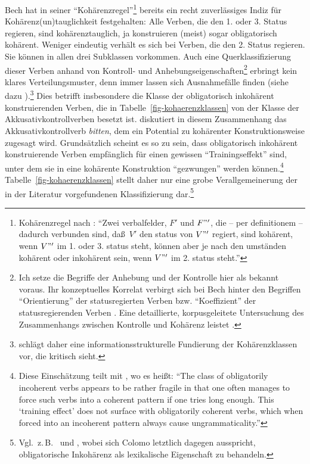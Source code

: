 Bech hat in seiner "`Kohärenzregel"'\footnote{Kohärenzregel nach \cite[\S 65]{Bech:55}: "`Zwei verbalfelder, $F'$ und $F"'$, die -- per definitionem -- dadurch verbunden sind, da\ss\ $V'$ den status von $V"'$ regiert, sind kohärent, wenn $V"'$ im 1. oder 3. status steht, können aber je nach den umständen kohärent oder inkohärent sein, wenn $V"'$ im 2. status steht."' } bereits ein recht zuverlässiges Indiz für Kohärenz\-(un)\-taug\-lich\-keit festgehalten: Alle Verben, die den 1. oder 3. Status regieren, sind kohärenztauglich, ja konstruieren (meist) sogar obligatorisch kohärent. Weniger eindeutig verhält es sich bei Verben, die den 2. Status regieren. Sie können in allen drei Subklassen vorkommen. Auch eine Querklassifizierung dieser Verben anhand von Kontroll- und Anhebungseigenschaften\footnote{Ich setze die Begriffe der Anhebung und der Kontrolle hier als bekannt voraus. Ihr konzeptuelles Korrelat verbirgt sich bei Bech hinter den Begriffen "`Orientierung"' der statusregierten Verben bzw. "`Koeffizient"' der statusregierenden Verben \cite[Kapitel~3]{Bech:55}. Eine detaillierte, korpusgeleitete Untersuchung des Zusammenhangs zwischen Kontrolle und Kohärenz leistet \cite{Grosse:05}. } erbringt kein klares Verteilungsmuster, denn immer lassen sich Ausnahmefälle finden (siehe dazu \citealt[\S2.3]{Meurers:99}).\footnote{\cite{Cook:01} schlägt daher eine informationsstrukturelle Fundierung der Kohärenzklassen vor, die \citet[Abschnitt~4.4]{Grosse:05} kritisch sieht.} Dies betrifft insbesondere die Klasse der obligatorisch inkohärent konstruierenden Verben, die in Tabelle~\ref{fig-kohaerenzklassen} von der Klasse der Akkusativkontrollverben besetzt ist. \cite{Grosse:05} diskutiert in diesem Zusammenhang das Akkusativkontrollverb {\it bitten}, dem ein Potential zu kohärenter Konstruktionsweise zugesagt wird. Grundsätzlich scheint es so zu sein, dass obligatorisch inkohärent konstruierende Verben empfänglich für einen gewissen "`Trainingseffekt"' sind, unter dem sie in eine kohärente Konstruktion "`gezwungen"' werden können.\footnote{Diese Einschätzung teilt \cite{Grosse:05} mit \citet[19, Fußnote 12]{Meurers:99}, wo es hei\ss t: "`The class of obligatorily incoherent verbs appears to be rather fragile in that one often manages to force such verbs into a coherent pattern if one tries long enough. This `training effect' does not surface with obligatorily coherent verbs, which when forced into an incoherent pattern always cause ungrammaticality."'} Tabelle~\ref{fig-kohaerenzklassen} stellt daher nur eine grobe Verallgemeinerung der in der Literatur vorgefundenen Klassifizierung dar.\footnote{Vgl.\ z.\,B.\ \citet[Kapitel~1]{Grosse:05} und \citet[Abschnitt~3.5.2, Tabelle~5, 207]{Colomo:11}, wobei sich Colomo letztlich dagegen ausspricht, obligatorische Inkohärenz als lexikalische Eigenschaft zu behandeln.}

